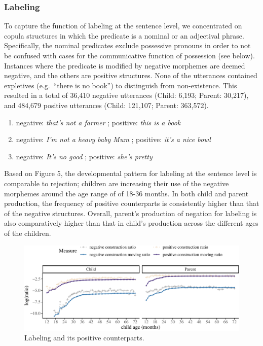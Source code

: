 \documentclass[
  english,
  man,floatsintext]{apa6}
\providecommand{\tightlist}{%
  \setlength{\itemsep}{0pt}\setlength{\parskip}{0pt}}
\begin{document}
\hypertarget{labeling}{%
\subsubsection{Labeling}\label{labeling}}

To capture the function of labeling at the sentence level, we concentrated on copula structures in which the predicate is a nominal or an adjectival phrase. Specifically, the nominal predicates exclude possessive pronouns in order to not be confused with cases for the communicative function of possession (see below). Instances where the predicate is modified by negative morphemes are deemed negative, and the others are positive structures. None of the utterances contained expletives (e.g.~``there is no book'') to distinguish from non-existence. This resulted in a total of 36,410 negative utterances (Child: 6,193; Parent: 30,217), and 484,679 positive utterances (Child: 121,107; Parent: 363,572).

\begin{enumerate}
\def\labelenumi{(\arabic{enumi})}
\setcounter{enumi}{8}
\tightlist
\item
  negative: \emph{that's not a farmer} ; positive: \emph{this is a book}
\item
  negative: \emph{I'm not a heavy baby Mum} ; positive: \emph{it's a nice bowl}
\item
  negative: \emph{It's no good} ; positive: \emph{she's pretty}
\end{enumerate}

Based on Figure 5, the developmental pattern for labeling at the sentence level is comparable to rejection; children are increasing their use of the negative morphemes around the age range of of 18-36 months. In both child and parent production, the frequency of positive counterparts is consistently higher than that of the negative structures. Overall, parent's production of negation for labeling is also comparatively higher than that in child's production across the different ages of the children.

\begin{figure}[H]

{\centering \includegraphics{neg_construction_article_files/figure-latex/learning-1} 

}

\caption{Labeling and its positive counterparts.}\label{fig:learning}
\end{figure}
\end{document}
